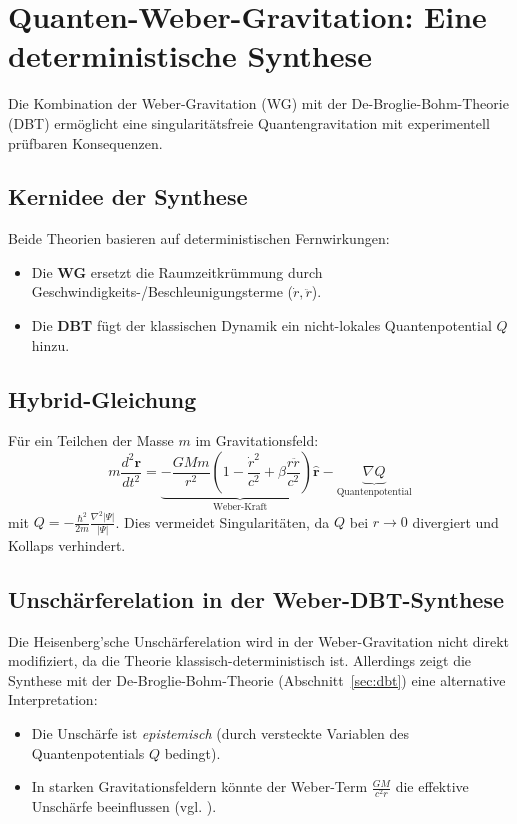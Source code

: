 \section{Quanten-Weber-Gravitation: Eine deterministische Synthese}
Die Kombination der Weber-Gravitation (WG) mit der De-Broglie-Bohm-Theorie (DBT) ermöglicht eine singularitätsfreie Quantengravitation mit experimentell prüfbaren Konsequenzen.

\subsection{Kernidee der Synthese}
Beide Theorien basieren auf deterministischen Fernwirkungen:
\begin{itemize}
    \item Die \textbf{WG} ersetzt die Raumzeitkrümmung durch Geschwindigkeits-/Beschleunigungsterme ($\dot{r}, \ddot{r}$).
    \item Die \textbf{DBT} fügt der klassischen Dynamik ein nicht-lokales Quantenpotential $Q$ hinzu.
\end{itemize}

\subsection{Hybrid-Gleichung}
Für ein Teilchen der Masse $m$ im Gravitationsfeld:
\begin{equation}
    m\frac{d^2\mathbf{r}}{dt^2} = \underbrace{-\frac{GMm}{r^2}\left(1-\frac{\dot{r}^2}{c^2}+\beta\frac{r\ddot{r}}{c^2}\right)\hat{\mathbf{r}}}_{\text{Weber-Kraft}} - \underbrace{\nabla Q}_{\text{Quantenpotential}}
\end{equation}
mit $Q = -\frac{\hbar^2}{2m}\frac{\nabla^2|\Psi|}{|\Psi|}$. Dies vermeidet Singularitäten, da $Q$ bei $r \to 0$ divergiert und Kollaps verhindert.

\subsection{Unschärferelation in der Weber-DBT-Synthese}
Die Heisenberg’sche Unschärferelation wird in der Weber-Gravitation nicht direkt modifiziert, da die Theorie klassisch-deterministisch ist. Allerdings zeigt die Synthese mit der
De-Broglie-Bohm-Theorie (Abschnitt~\ref{sec:dbt}) eine alternative Interpretation:
\begin{itemize}
    \item Die Unschärfe ist \textit{epistemisch} (durch versteckte Variablen des Quantenpotentials $Q$ bedingt).
    \item In starken Gravitationsfeldern könnte der Weber-Term $\frac{GM}{c^2 r}$ die effektive Unschärfe beeinflussen (vgl. \cite{bohm1952}).
\end{itemize}

